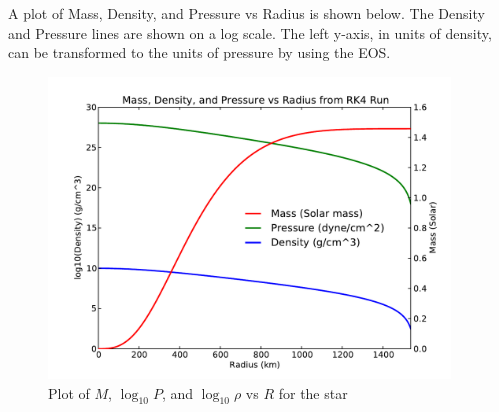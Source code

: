 \documentclass[11pt,letterpaper]{article}
\begin{document}
\section{}

A plot of Mass, Density, and Pressure vs Radius is shown below. The Density and 
Pressure lines are shown on a log scale. The left y-axis, in units of density, can
be transformed to the units of pressure by using the EOS. 

\begin{figure}[bth]
\centering
\includegraphics[width=0.95\textwidth]{MPrho.pdf}
\caption{Plot of $M$, $\log_{10}P$, and $\log_{10}\rho$ vs $R$ for the star}
\label{fig:MPrho}
\end{figure}
\end{document}
